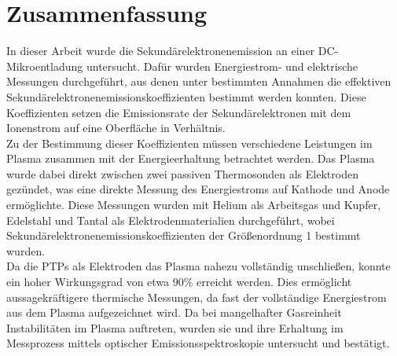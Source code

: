 \section*{Zusammenfassung}
In dieser Arbeit wurde die Sekundärelektronenemission an einer DC-Mikroentladung untersucht. Dafür wurden Energiestrom- und elektrische Messungen durchgeführt, aus denen unter bestimmten Annahmen die effektiven Sekundärelektronenemissionskoeffizienten bestimmt werden konnten. Diese Koeffizienten setzen die Emissionsrate der Sekundärelektronen mit dem Ionenstrom auf eine Oberfläche in Verhältnis.\\

Zu der Bestimmung dieser Koeffizienten müssen verschiedene Leistungen im Plasma zusammen mit der Energieerhaltung betrachtet werden. Das Plasma wurde dabei direkt zwischen zwei passiven Thermosonden als Elektroden gezündet, was eine direkte Messung des Energiestroms auf Kathode und Anode ermöglichte. Diese Messungen wurden mit Helium als Arbeitsgas und Kupfer, Edelstahl und Tantal als Elektrodenmaterialien durchgeführt, wobei Se\-kun\-där\-el\-ek\-tro\-nen\-e\-miss\-ions\-ko\-ef\-fi\-zien\-ten der Größenordnung 1 bestimmt wurden.\\

Da die PTPs als Elektroden das Plasma nahezu vollständig unschließen, konnte ein hoher Wirkungsgrad von etwa 90\% erreicht werden. Dies ermöglicht aussagekräftigere thermische Messungen, da fast der vollständige Energiestrom aus dem Plasma aufgezeichnet wird. Da bei mangelhafter Gasreinheit Instabilitäten im Plasma auftreten, wurden sie und ihre Erhaltung im Messprozess mittels optischer Emissionsspektroskopie untersucht und bestätigt.